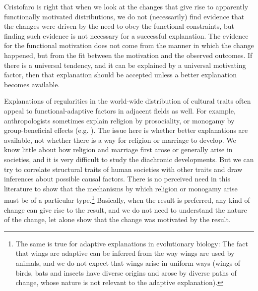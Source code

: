 \documentclass[output=paper]{langsci/langscibook}
\begin{document}
Cristofaro\label{Haspelmathchapterpageref} is right that when we look at the changes that give rise to apparently functionally motivated distributions, we do not (necessarily) find evidence that the changes were driven by the need to obey the functional constraints, but finding such evidence is not necessary for a successful explanation.
The evidence for the functional motivation does not come from the manner in which the change happened, but from the fit between the motivation and the observed outcomes. If there is a universal tendency, and it can be explained by a universal motivating factor, then that explanation should be accepted unless a better explanation becomes available.

Explanations of regularities in the world-wide distribution of cultural traits often appeal to functional-adaptive factors in adjacent fields as well. For example, anthropologists sometimes explain religion by prosociality, or monogamy by group-beneficial effects (e.g. \citealt{PaciottiEtAl2011,HenrichEtAl2012}). The issue here is whether better explanations are available, not whether there is a way for religion or marriage to develop. We know little about how religion and marriage first arose or generally arise in societies, and it is very difficult to study the diachronic developments. But we can try to correlate structural traits of human societies with other traits and draw inferences about possible causal factors. There is no perceived need in this literature to show that the mechanisms by which religion or monogamy arise must be of a particular type.\footnote{The same is true for adaptive explanations in evolutionary biology: The fact that wings are adaptive can be inferred from the way wings are used by animals, and we do not expect that wings arise in uniform ways (wings of birds, bats and insects have diverse origins and arose by diverse paths of change, whose nature is not relevant to the adaptive explanation).} Basically, when the result is preferred, any kind of change can give rise to the result, and we do not need to understand the nature of the change, let alone show that the change was motivated by the result.
\end{document}
